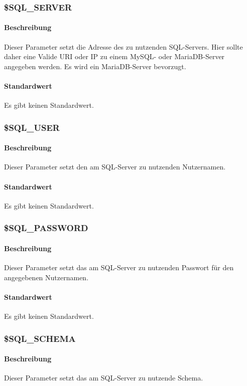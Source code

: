 \subsubsection{\$SQL\_SERVER}
\paragraph{Beschreibung}Dieser Parameter setzt die Adresse des zu nutzenden SQL-Servers. Hier sollte daher eine Valide URI oder IP zu einem MySQL- oder MariaDB-Server angegeben werden. Es wird ein MariaDB-Server bevorzugt.
\paragraph{Standardwert}Es gibt keinen Standardwert.

\subsubsection{\$SQL\_USER}
\paragraph{Beschreibung}Dieser Parameter setzt den am SQL-Server zu nutzenden Nutzernamen.
\paragraph{Standardwert}Es gibt keinen Standardwert.

\subsubsection{\$SQL\_PASSWORD}
\paragraph{Beschreibung}Dieser Parameter setzt das am SQL-Server zu nutzenden Passwort für den angegebenen Nutzernamen. 
\paragraph{Standardwert}Es gibt keinen Standardwert.

\subsubsection{\$SQL\_SCHEMA}
\paragraph{Beschreibung}Dieser Parameter setzt das am SQL-Server zu nutzende Schema.

